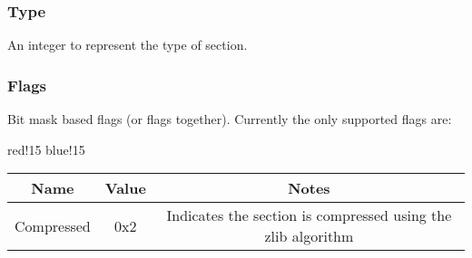 \subsubsection{Type}
An integer to represent the type of section.

\subsubsection{Flags}
Bit mask based flags (or flags together). Currently the only supported flags are:
\begin{center}
    {
        {red!15}
        {blue!15}
        \begin{tabular}{|c|c|c|}
            \hline
            \textbf{Name} & \textbf{Value} & \textbf{Notes} \\
    
            \hline\hline
            Compressed & 0x2 & Indicates the section is compressed using the zlib algorithm \\
            \hline
        \end{tabular}
    }
\end{center}